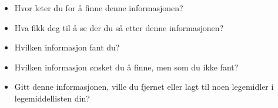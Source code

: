 \begin{enumerate}
\begin{itemize}
\item Hvor leter du for å finne denne informasjonen? 
\item Hva fikk deg til å se der du så etter denne informasjonen? 
\item Hvilken informasjon fant du? 
\item Hvilken informasjon ønsket du å finne, men som du ikke fant? 
\item Gitt denne informasjonen, ville du fjernet eller lagt til noen legemidler i legemiddellisten din?
\end{itemize}
\end{enumerate}

